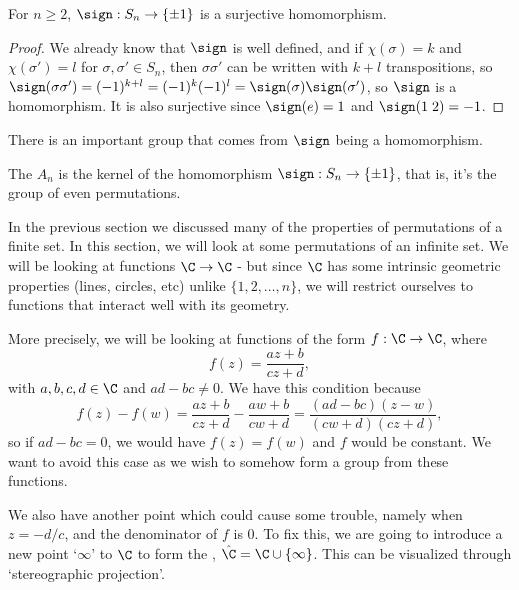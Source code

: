 \begin{proposition}
	For $n \geq 2$, $\sign : S_n \rightarrow \{\pm 1\}$ is a surjective homomorphism.
\end{proposition}
\begin{proof}
	We already know that $\sign$ is well defined, and if $\chi(\sigma) = k$ and $\chi(\sigma') = l$ for $\sigma, \sigma' \in S_n$, then $\sigma \sigma'$ can be written with $k + l$ transpositions, so $\sign(\sigma \sigma') = (-1)^{k + l} = (-1)^k (-1)^l = \sign(\sigma) \sign(\sigma')$, so $\sign$ is a homomorphism. It is also surjective since $\sign(e) = 1$ and $\sign(1\; 2) = -1$.
\end{proof}

There is an important group that comes from $\sign$ being a homomorphism.

\begin{definition}
	The  $A_n$ is the kernel of the homomorphism $\sign : S_n \rightarrow \{ \pm 1\}$, that is, it's the group of even permutations.
\end{definition}



In the previous section we discussed many of the properties of permutations of a finite set. In this section, we will look at some permutations of an infinite set. We will be looking at functions $\C \rightarrow \C$ - but since $\C$ has some intrinsic geometric properties (lines, circles, etc) unlike $\{1, 2, \dots, n\}$, we will restrict ourselves to functions that interact well with its geometry.

More precisely, we will be looking at functions of the form $f: \C \rightarrow \C$, where
$$
f(z) = \frac{az + b}{cz + d},
$$
with $a, b, c, d \in \C$ and $ad - bc \neq 0$. We have this condition because 
$$
f(z) - f(w) = \frac{az + b}{cz + d} - \frac{aw + b}{cw + d} = \frac{(ad - bc)(z - w)}{(cw + d)(cz + d)},
$$
so if $ad - bc = 0$, we would have $f(z) = f(w)$ and $f$ would be constant. We want to avoid this case as we wish to somehow form a group from these functions. 

We also have another point which could cause some trouble, namely when $z = -d/c$, and the denominator of $f$ is 0. To fix this, we are going to introduce a new point `$\infty$' to $\C$ to form the , $\hat{\C} = \C \cup \{ \infty \}$.  This can be visualized through `stereographic projection'.

